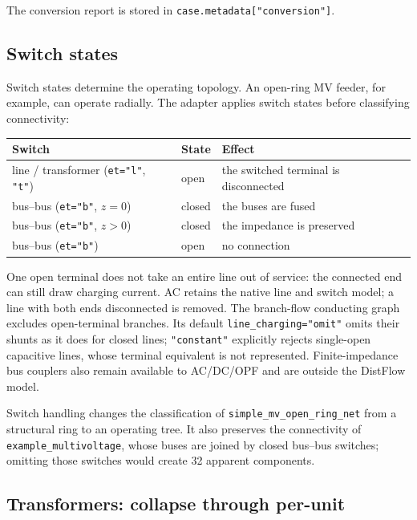 \documentclass[11pt,a4paper]{report}
\newcommand{\trap}[1]{\begin{warnbox}#1\end{warnbox}}
\newcommand{\code}[1]{\texttt{\small #1}}
\begin{document}
The conversion report is stored in \code{case.metadata["conversion"]}.

\subsection{Switch states}

Switch states determine the operating topology. An open-ring MV feeder, for
example, can operate radially. The adapter applies switch states before
classifying connectivity:

\begin{center}\small
\begin{tabular}{@{}lll@{}}
\toprule
Switch & State & Effect \\
\midrule
line / transformer (\code{et="l"}, \code{"t"}) & open   & the switched terminal is disconnected \\
bus--bus (\code{et="b"}, $z=0$)                 & closed & the buses are fused \\
bus--bus (\code{et="b"}, $z>0$)                 & closed & the impedance is preserved \\
bus--bus (\code{et="b"})                        & open   & no connection \\
\bottomrule
\end{tabular}
\end{center}

One open terminal does not take an entire line out of service: the connected
end can still draw charging current. AC retains the native line and switch
model; a line with both ends disconnected is removed. The branch-flow
conducting graph excludes open-terminal branches. Its default
\code{line\_charging="omit"} omits their shunts as it does for closed lines;
\code{"constant"} explicitly rejects single-open capacitive lines, whose
terminal equivalent is not represented. Finite-impedance bus couplers also
remain available to AC/DC/OPF and are outside the DistFlow model.

\trap{Switch handling changes the classification of
\code{simple\_mv\_open\_ring\_net} from a structural ring to an operating
tree. It also preserves the connectivity of \code{example\_multivoltage},
whose buses are joined by closed bus--bus switches; omitting those switches
would create 32 apparent components.}

\subsection{Transformers: collapse through per-unit}
\end{document}
